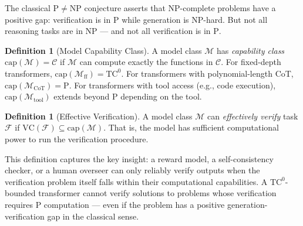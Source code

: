 \documentclass{article}
\theoremstyle{definition}
\newtheorem{definition}[theorem]{Definition}
\theoremstyle{remark}
\newcommand{\TC}{\mathrm{TC}^0}
\newcommand{\PTIME}{\mathrm{P}}
\newcommand{\NP}{\mathrm{NP}}
\newcommand{\VC}{\mathrm{VC}}           %
\newcommand{\calM}{\mathcal{M}}         %
\newcommand{\calF}{\mathcal{F}}         %
\newcommand{\calC}{\mathcal{C}}         %
\newcommand{\CoT}{\mathrm{CoT}}
\begin{document}
The classical $\PTIME \neq \NP$ conjecture asserts that $\NP$-complete problems have a positive gap: verification is in $\PTIME$ while generation is $\NP$-hard.
But not all reasoning tasks are in $\NP$ --- and not all verification is in $\PTIME$.

\begin{definition}[Model Capability Class]
\label{def:cap}
A model class $\calM$ has \emph{capability class} $\mathrm{cap}(\calM) = \calC$ if $\calM$ can compute exactly the functions in $\calC$.
For fixed-depth transformers, $\mathrm{cap}(\calM_{\text{ff}}) = \TC$.
For transformers with polynomial-length CoT, $\mathrm{cap}(\calM_{\CoT}) = \PTIME$.
For transformers with tool access (e.g., code execution), $\mathrm{cap}(\calM_{\text{tool}})$ extends beyond $\PTIME$ depending on the tool.
\end{definition}

\begin{definition}[Effective Verification]
\label{def:effver}
A model class $\calM$ can \emph{effectively verify} task $\calF$ if $\VC(\calF) \subseteq \mathrm{cap}(\calM)$.
That is, the model has sufficient computational power to run the verification procedure.
\end{definition}

This definition captures the key insight: a reward model, a self-consistency checker, or a human overseer can only reliably verify outputs when the verification problem itself falls within their computational capabilities.
A $\TC$-bounded transformer cannot verify solutions to problems whose verification requires $\PTIME$ computation --- even if the problem has a positive generation-verification gap in the classical sense.
\end{document}
